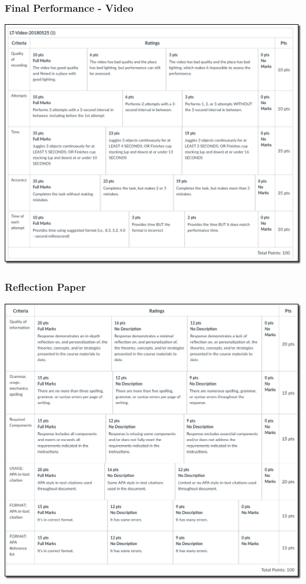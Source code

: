 \documentclass[
  letterpaper,
  DIV=11,
  numbers=noendperiod,
  oneside]{scrartcl}
\begin{document}
\hypertarget{final-performance---video}{%
\subsubsection{Final Performance -
Video}\label{final-performance---video}}

\includegraphics{images/paste-97AE7969.png}

\hypertarget{reflection-paper}{%
\subsubsection{Reflection Paper}\label{reflection-paper}}

\includegraphics{images/paste-3AE7E91C.png}
\end{document}
